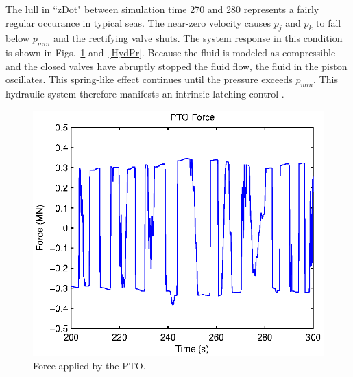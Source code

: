 \documentclass[twocolumn,10pt]{asme2e}
\begin{document}
The lull in ``zDot" between simulation time 270 and 280 represents a fairly regular occurance in typical seas. The near-zero velocity causes $p_j$ and $p_k$ to fall below $p_{min}$ and the rectifying valve shuts. The system response in this condition is shown in Figs.~\ref{HydF} and~\ref{HydPr}. Because the fluid is modeled as compressible and the closed valves have abruptly stopped the fluid flow, the fluid in the piston oscillates. This spring-like effect continues until the pressure exceeds $p_{min}$. This hydraulic system therefore manifests an intrinsic latching control \cite{falnes2005ocean}.

\begin{figure}[t]
    \centering
    \includegraphics[width=1\columnwidth]{Images/ptoForce}
    \caption{Force applied by the PTO.}
    \label{HydF}
    \end{figure}
\end{document}
